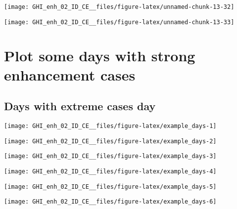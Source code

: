 \documentclass[
  10pt,
  a4paper,oneside]{article}
\begin{document}
\begin{center}\texttt{[image: GHI\_enh\_02\_ID\_CE\_\_files/figure-latex/unnamed-chunk-13-32]} \end{center}

\begin{center}\texttt{[image: GHI\_enh\_02\_ID\_CE\_\_files/figure-latex/unnamed-chunk-13-33]} \end{center}

\FloatBarrier

\hypertarget{plot-some-days-with-strong-enhancement-cases}{%
\section{Plot some days with strong enhancement cases}\label{plot-some-days-with-strong-enhancement-cases}}

\FloatBarrier

\hypertarget{days-with-extreme-cases-day}{%
\subsection{Days with extreme cases day}\label{days-with-extreme-cases-day}}

\begin{center}\texttt{[image: GHI\_enh\_02\_ID\_CE\_\_files/figure-latex/example\_days-1]} \end{center}

\begin{center}\texttt{[image: GHI\_enh\_02\_ID\_CE\_\_files/figure-latex/example\_days-2]} \end{center}

\begin{center}\texttt{[image: GHI\_enh\_02\_ID\_CE\_\_files/figure-latex/example\_days-3]} \end{center}

\begin{center}\texttt{[image: GHI\_enh\_02\_ID\_CE\_\_files/figure-latex/example\_days-4]} \end{center}

\begin{center}\texttt{[image: GHI\_enh\_02\_ID\_CE\_\_files/figure-latex/example\_days-5]} \end{center}

\begin{center}\texttt{[image: GHI\_enh\_02\_ID\_CE\_\_files/figure-latex/example\_days-6]} \end{center}
\end{document}
